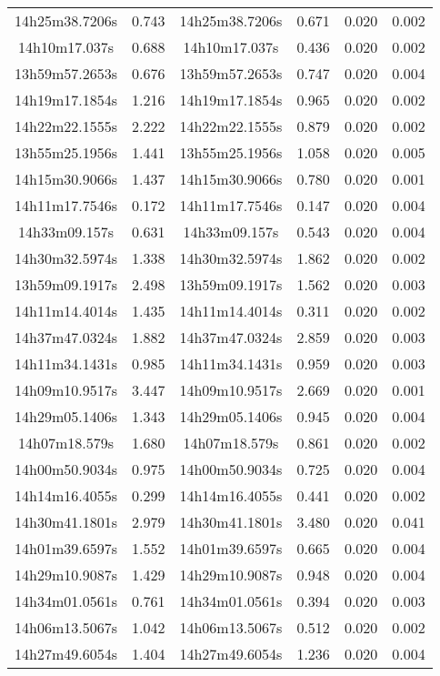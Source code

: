 \begin{table}
\begin{tabular}{cccccc}
14h25m38.7206s & 0.743 & 14h25m38.7206s & 0.671 & 0.020 & 0.002 \\
14h10m17.037s & 0.688 & 14h10m17.037s & 0.436 & 0.020 & 0.002 \\
13h59m57.2653s & 0.676 & 13h59m57.2653s & 0.747 & 0.020 & 0.004 \\
14h19m17.1854s & 1.216 & 14h19m17.1854s & 0.965 & 0.020 & 0.002 \\
14h22m22.1555s & 2.222 & 14h22m22.1555s & 0.879 & 0.020 & 0.002 \\
13h55m25.1956s & 1.441 & 13h55m25.1956s & 1.058 & 0.020 & 0.005 \\
14h15m30.9066s & 1.437 & 14h15m30.9066s & 0.780 & 0.020 & 0.001 \\
14h11m17.7546s & 0.172 & 14h11m17.7546s & 0.147 & 0.020 & 0.004 \\
14h33m09.157s & 0.631 & 14h33m09.157s & 0.543 & 0.020 & 0.004 \\
14h30m32.5974s & 1.338 & 14h30m32.5974s & 1.862 & 0.020 & 0.002 \\
13h59m09.1917s & 2.498 & 13h59m09.1917s & 1.562 & 0.020 & 0.003 \\
14h11m14.4014s & 1.435 & 14h11m14.4014s & 0.311 & 0.020 & 0.002 \\
14h37m47.0324s & 1.882 & 14h37m47.0324s & 2.859 & 0.020 & 0.003 \\
14h11m34.1431s & 0.985 & 14h11m34.1431s & 0.959 & 0.020 & 0.003 \\
14h09m10.9517s & 3.447 & 14h09m10.9517s & 2.669 & 0.020 & 0.001 \\
14h29m05.1406s & 1.343 & 14h29m05.1406s & 0.945 & 0.020 & 0.004 \\
14h07m18.579s & 1.680 & 14h07m18.579s & 0.861 & 0.020 & 0.002 \\
14h00m50.9034s & 0.975 & 14h00m50.9034s & 0.725 & 0.020 & 0.004 \\
14h14m16.4055s & 0.299 & 14h14m16.4055s & 0.441 & 0.020 & 0.002 \\
14h30m41.1801s & 2.979 & 14h30m41.1801s & 3.480 & 0.020 & 0.041 \\
14h01m39.6597s & 1.552 & 14h01m39.6597s & 0.665 & 0.020 & 0.004 \\
14h29m10.9087s & 1.429 & 14h29m10.9087s & 0.948 & 0.020 & 0.004 \\
14h34m01.0561s & 0.761 & 14h34m01.0561s & 0.394 & 0.020 & 0.003 \\
14h06m13.5067s & 1.042 & 14h06m13.5067s & 0.512 & 0.020 & 0.002 \\
14h27m49.6054s & 1.404 & 14h27m49.6054s & 1.236 & 0.020 & 0.004 \\

\end{tabular}
\end{table}
